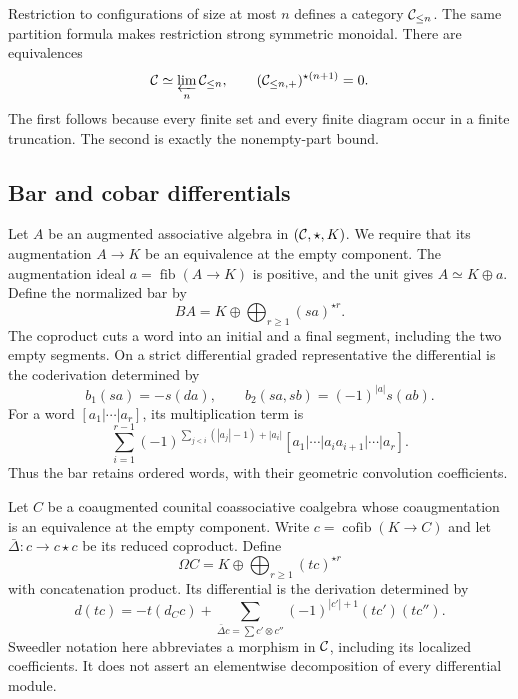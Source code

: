 Restriction to configurations of size at most \(n\) defines a category \(\mathcal C_{\leq n}\).
The same partition formula makes restriction strong symmetric monoidal.
There are equivalences
\[
 \mathcal C\simeq\varprojlim_n\mathcal C_{\leq n},
 \qquad (\mathcal C_{\leq n,+})^{\star(n+1)}=0.
\]
The first follows because every finite set and every finite diagram occur in a finite truncation.
The second is exactly the nonempty-part bound.

\subsection{Bar and cobar differentials}

Let\label{ogd:def:augmented-atlas-algebra} \(A\) be an augmented associative algebra in \((\mathcal C,\star,K)\).
We require that its augmentation \(A\to K\) be an equivalence at the empty component.
The augmentation ideal \(a=\operatorname{fib}(A\to K)\) is positive, and the unit gives \(A\simeq K\oplus a\).
Define the normalized bar by
\begin{equation}\label{ogd:eq:bar}
 BA=K\oplus\bigoplus_{r\geq1}(sa)^{\star r}.
\end{equation}
The coproduct cuts a word into an initial and a final segment, including the two empty segments.
On a strict differential graded representative the differential is the coderivation determined by
\begin{equation}\label{ogd:eq:bar-signs}
 b_1(sa)=-s(da),\qquad b_2(sa,sb)=(-1)^{|a|}s(ab).
\end{equation}
For a word \([a_1|\cdots|a_r]\), its multiplication term is
\[
 \sum_{i=1}^{r-1}(-1)^{\sum_{j<i}(|a_j|-1)+|a_i|}
 [a_1|\cdots|a_ia_{i+1}|\cdots|a_r].
\]
Thus the bar retains ordered words, with their geometric convolution coefficients.

Let\label{ogd:def:reduced-atlas-coalgebra} \(C\) be a coaugmented counital coassociative coalgebra whose coaugmentation is an equivalence at the empty component.
Write \(c=\operatorname{cofib}(K\to C)\) and let \(\bar\Delta:c\to c\star c\) be its reduced coproduct.
Define
\begin{equation}\label{ogd:eq:cobar}
 \Omega C=K\oplus\bigoplus_{r\geq1}(tc)^{\star r}
\end{equation}
with concatenation product.
Its differential is the derivation determined by
\begin{equation}\label{ogd:eq:cobar-signs}
 d(tc)=-t(d_Cc)+
 \sum_{\bar\Delta c=\sum c'\otimes c''}
          (-1)^{|c'|+1}(tc')(tc'').
\end{equation}
Sweedler notation here abbreviates a morphism in \(\mathcal C\), including its localized coefficients.
It does not assert an elementwise decomposition of every differential module.

